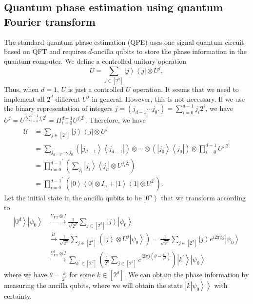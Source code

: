 \documentclass[11pt]{article}
\newcommand{\bra}[1]{\left\langle #1\right|}
\newcommand{\ket}[1]{\left|#1\right\rangle}
\begin{document}
\subsection{Quantum phase estimation using quantum Fourier transform}
The standard quantum phase estimation (QPE) uses one signal quantum circuit based on QFT and requires $d$-ancilla qubits to store the phase information in the quantum computer. We define a controlled unitary operation 
\begin{equation}
    U = \sum_{j\in[2^d]}\ket{j}\bra{j}\otimes U^{j},
\end{equation}
Thus, when $d = 1$, $U$ is just a controlled $U$ operation. It seems that we need to implement all $2^d$ different $U^j$ in general. However, this is not necessary. If we use the binary representation of integers $j = (j_{d-1}\cdots j_0.) = \sum_{i=0}^{d-1}j_i2^i$, we have $U^j = U^{\sum_{i=0}^{d-1}j_i2^i} = \Pi_{i=0}^{d-1}U^{j_i2^i}$. Therefore, we have
\begin{align}
    \mathcal{U} &= \sum_{j\in[2^d]}\ket{j}\bra{j}\otimes U^j \nonumber \\
    &= \sum_{j_{d-1},\cdots,j_0}(\ket{j_{d-1}}\bra{j_{d-1}})\otimes\cdots\otimes(\ket{j_0}\bra{j_0})\otimes\prod_{i=0}^{d-1}U^{j_i2^i}\nonumber \\ 
    &= {\prod_{i=0}^{d-1}}^{'}\left(\sum_{j_i}\ket{j_i}\bra{j_i}\otimes U^{j_i2_i}\right) \nonumber \\
    &= {\prod_{i=0}^{d-1}}^{'}\left(\ket{0}\bra{0}\otimes I_n + \ket{1}\bra{1}\otimes U^{2^i}\right).
\end{align}
Let the initial state in the ancilla qubits to be $\ket{0^n}$ that we transform according to 
\begin{align}\label{QPE_circuit}
    \ket{0^d}\ket{\psi_0} &\xrightarrow{U_{\text{FT}}\otimes I}  \frac{1}{\sqrt{2^d}}\sum_{j\in[2^d]}\ket{j}\ket{\psi_0} \\
    &\xrightarrow{\mathcal{U}} \frac{1}{\sqrt{2^d}}\sum_{j\in[2^d]}(\ket{j}\otimes U^j\ket{\psi_0}) = \frac{1}{\sqrt{2^d}}\sum_{j\in[2^d]}\ket{j}e^{i2\pi\phi j}\ket{\psi_0}\nonumber \\
    &\xrightarrow{U_{\text{FT}}^\dagger\otimes I} \sum_{k^{'}\in [2^d]}\left(\frac{1}{2^d}\sum_{j\in[2^d]}e^{i2\pi j\left(\theta - \frac{k^{'}}{2^d}\right)}\right)\ket{k^{'}}\ket{\psi_0}
\end{align}
where we have $\theta = \frac{k}{2^d}$ for some $k\in[2^d]$. We can obtain the phase information by measuring the ancilla qubits, where we will obtain the state $\ket{k\ket{\psi_0}}$ with certainty.
\end{document}
